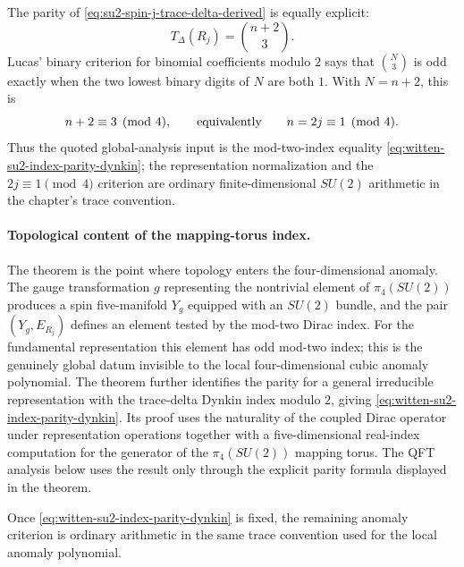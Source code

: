 The parity of \eqref{eq:su2-spin-j-trace-delta-derived} is equally explicit:
\[
  T_\Delta(R_j)=\binom{n+2}{3}.
\]
Lucas' binary criterion for binomial coefficients modulo \(2\) says that
\(\binom N3\) is odd exactly when the two lowest binary digits of \(N\) are
both \(1\).  With \(N=n+2\), this is
\begin{equation}
  n+2\equiv3\pmod4,
  \qquad\hbox{equivalently}\qquad
  n=2j\equiv1\pmod4 .
  \label{eq:su2-witten-parity-arithmetic}
\end{equation}
Thus the quoted global-analysis input is the mod-two-index equality
\eqref{eq:witten-su2-index-parity-dynkin}; the representation normalization
and the \(2j\equiv1\pmod4\) criterion are ordinary finite-dimensional
\(SU(2)\) arithmetic in the chapter's trace convention.

\paragraph{Topological content of the mapping-torus index.}
The theorem is the point where topology enters the four-dimensional anomaly.
The gauge transformation \(g\) representing the nontrivial element of
\(\pi_4(SU(2))\) produces a spin five-manifold \(Y_g\) equipped with an
\(SU(2)\) bundle, and the pair \((Y_g,E_{R_j})\) defines an element tested by
the mod-two Dirac index.  For the fundamental representation this element has
odd mod-two index; this is the genuinely global datum invisible to the local
four-dimensional cubic anomaly polynomial.  The theorem further identifies the
parity for a general irreducible representation with the trace-delta Dynkin
index modulo \(2\), giving \eqref{eq:witten-su2-index-parity-dynkin}.  Its
proof uses the naturality of the coupled Dirac operator under representation
operations together with a five-dimensional real-index computation for the
generator of the \(\pi_4(SU(2))\) mapping torus.  The QFT analysis below uses
the result only through the explicit parity formula displayed in the theorem.

Once \eqref{eq:witten-su2-index-parity-dynkin} is fixed, the remaining anomaly
criterion is ordinary arithmetic in the same trace convention used for the
local anomaly polynomial.

